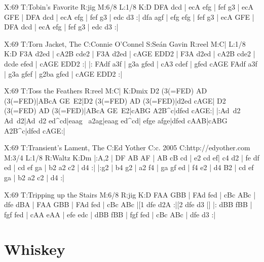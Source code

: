 \documentclass{article}
\begin{document}
\begin{abc}[name]
X:69
T:Tobin's Favorite
R:jig
M:6/8
L:1/8
K:D
DFA dcd | ecA efg | fef g3 | ecA GFE |
DFA dcd | ecA efg | fef g3 | edc d3 :|
dfa agf | efg efg | fef g3 | ecA GFE |
DFA dcd | ecA efg | fef g3 | edc d3 :|
\end{abc}

\begin{abc}[name]
X:69
T:Torn Jacket, The
C:Connie O'Connel
S:Seán Gavin
R:reel
M:C|
L:1/8
K:D
F3A d2ed | cA2B cde2 | F3A d2ed | cAGE EDD2 |
F3A d2ed | cA2B cde2 | dcde efed | cAGE EDD2 :|
|: FAdf a3f | g3a gfed | cA3 cdef | gfed cAGE
FAdf a3f | g3a gfef | g2ba gfed | cAGE EDD2 :|
\end{abc}

\begin{abc}[name]
X:69
T:Toss the Feathers
R:reel
M:C|
K:Dmix
D2 (3(=FED) AD (3(=FED)|ABcA GE~E2|D2 (3(=FED) AD (3(=FED)|d2ed cAGE|
D2 (3(=FED) AD (3(=FED)|ABcA GE~E2|cABG A2B^c|dfed cAGE:|
|:Ad~d2 Ad~d2|Ad~d2 ed^cd|eaag ~a2ag|eaag ed^cd|
efge afge|dfed cAAB|cABG A2B^c|dfed cAGE:|
\end{abc}

\begin{abc}[name]
X:69
T:Transient's Lament, The
C:Ed Yother
C:c. 2005
C:http://edyother.com
M:3/4
L:1/8
R:Waltz
K:Dm
|:A,2 | DF AB AF | AB cB cd | e2 cd ef| c4 d2 |
 fe df ed | cd ef ga | b2 a2 c2 | d4 :|
|:g2 | b4 g2 | a2 f4 | ga gf ed | f4 e2 |
 d4 B2 | cd ef ga | b2 a2 c2 | d4 :|
\end{abc}

\begin{abc}[name]
X:69
T:Tripping up the Stairs
M:6/8
R:jig
K:D
FAA GBB | FAd fed | cBc ABc | dfe dBA |
FAA GBB | FAd fed | cBc ABc |[1 dfe d2A :|[2 dfe d3 |]
|: dBB fBB | fgf fed | cAA eAA | efe edc |
dBB fBB | fgf fed | cBc ABc | dfe d3 :|
\end{abc}

\section{Whiskey}
\end{document}
